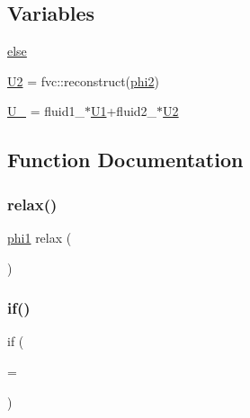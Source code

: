 \subsection*{Variables}
\begin{DoxyCompactItemize}
\item 
\hyperlink{reconstructU__2p_8H_a0544c3fe466e421738dae463968b70ba}{else}
\item 
\hyperlink{reconstructU__2p_8H_a9415ac9cefca559abb91219426b7250b}{U2} = fvc\+::reconstruct(\hyperlink{refsAndControls__2p_8H_adb57687d5d74249f550cb14883eebe4d}{phi2})
\item 
\hyperlink{reconstructU__2p_8H_a12e26642a08fb9a2f5c78dbf346aa511}{U\+\_\+} = fluid1\+\_\+$\ast$\hyperlink{UEqns__2p_8H_a36d208f2338b1dd1ec90b2b1333d5f42}{U1}+fluid2\+\_\+$\ast$\hyperlink{UEqns__2p_8H_af55bc79119bfe60c39e86c5ddf988e7a}{U2}
\end{DoxyCompactItemize}


\subsection{Function Documentation}
\mbox{\label{reconstructU__2p_8H_a46e0f94b4f0efd7aa71582c9d08e04b4}} 
\subsubsection{\texorpdfstring{relax()}{relax()}}
{\footnotesize\ttfamily \hyperlink{refsAndControls__2p_8H_aaf6a6a2ee3cff53881bc1adab47f2a9a}{phi1} relax (\begin{DoxyParamCaption}{ }\end{DoxyParamCaption})}

\mbox{\label{reconstructU__2p_8H_a774b870e54be2371df2cd786d08f1414}} 
\subsubsection{\texorpdfstring{if()}{if()}}
{\footnotesize\ttfamily if (\begin{DoxyParamCaption}\item[{porous\+Interface\+Sharpness\+\_\+ !}]{ = {} }\end{DoxyParamCaption})}



